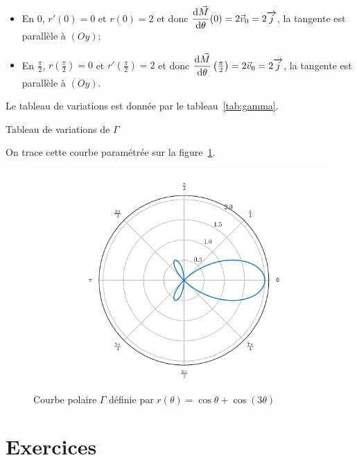 \begin{itemize}
  \item En \(0\), \(r'(0)=0\) et \(r(0)=2\) et donc 
    \(\dfrac{\mathrm{d} \vec{M}}{\mathrm{d} \theta}(0)=2 \vec{v}_0 = 2 \overrightarrow{j}\), la tangente est 
    parallèle à \((Oy)\);
  \item En \(\frac{\pi}{2}\), \(r\left(\frac{\pi}{2}\right)=0\) et 
    \(r'\left(\frac{\pi}{2}\right)=2\) et donc 
    \(\dfrac{\mathrm{d} \vec{M}}{\mathrm{d} \theta}\left(\frac{\pi}{2}\right)=2 \vec{v}_0 = 2 
    \overrightarrow{j}\), la tangente est parallèle à \((Oy)\).
\end{itemize}

Le tableau de variations est donnée par le tableau~\ref{tab:gamma}.

\begin{table}
  \centering   
  \caption{Tableau de variations de \(\Gamma\)}
  \label{tab:gamma}
\end{table}

On trace cette courbe paramétrée sur la figure~\ref{fig:pol}.
\begin{figure}
  \centering
  \includegraphics[scale = 1]{courbepolaire.png}
  \caption{Courbe polaire \(\Gamma\) définie par \(r(\theta)=\cos\theta + 
  \cos(3\theta)\)}
  \label{fig:pol}
\end{figure}
\clearpage
\section{Exercices}

